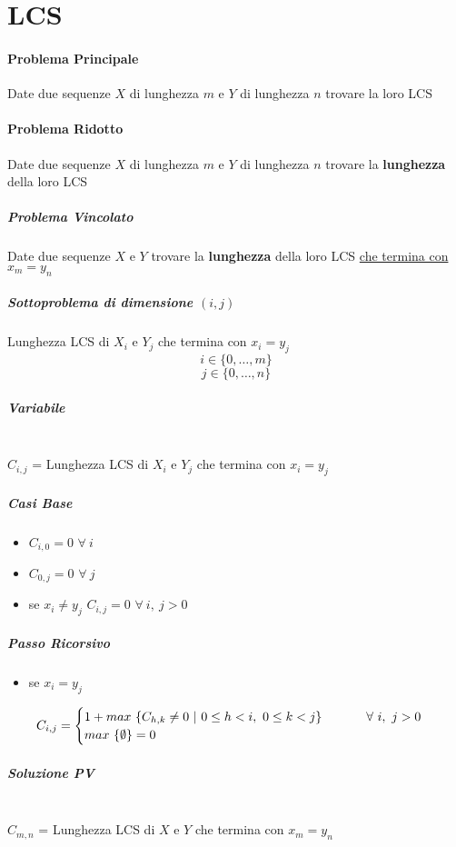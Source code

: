 \documentclass[12pt]{article}
\begin{document}
\section{LCS}
\paragraph{Problema Principale}
Date due sequenze $X$ di lunghezza $m$ e $Y$ di lunghezza $n$ trovare la loro LCS
\paragraph{Problema Ridotto}
Date due sequenze $X$ di lunghezza $m$ e $Y$ di lunghezza $n$ trovare la \textbf{lunghezza} della loro LCS
\subparagraph{Problema Vincolato}
Date due sequenze $X$ e $Y$ trovare la \textbf{lunghezza} della loro LCS \underline{che termina con $x_m = y_n$}
\subparagraph{Sottoproblema di dimensione $(i, j)$}
Lunghezza LCS di $X_i$ e $Y_j$ che termina con $x_i = y_j$
$$i \in \{0, \dots, m\}$$
$$j \in \{0, \dots, n\}$$
\subparagraph{Variabile}\mbox{}\\
$C_{i, j}$ = Lunghezza LCS di $X_i$ e $Y_j$ che termina con $x_i = y_j$
\subparagraph{Casi Base}
\begin{itemize}
    \item $C_{i,0} = 0$ \hspace{1cm} $\forall \ i$
    \item $C_{0,j} = 0$ \hspace{1cm} $\forall \ j$
    \item se $x_i \neq y_j$ \hspace{1cm} $C_{i,j} = 0$ \hspace{1cm} $\forall \ i, \ j > 0$
\end{itemize}
\subparagraph{Passo Ricorsivo}
\begin{itemize}
    \item se $x_i = y_j$
\end{itemize}
\[
    C_{i,j}=\begin{cases}
        1 + max \ \{C_{h,k}\neq 0 \ | \ 0\leq h<i, \ 0\leq k<j\}$ \hspace{1cm} $\forall \ i, \ j > 0 \\
        max \ \{\emptyset\} = 0
    \end{cases}
\]
\subparagraph{Soluzione PV}\mbox{}\\
$C_{m, n}$ = Lunghezza LCS di $X$ e $Y$ che termina con $x_m = y_n$
\end{document}
